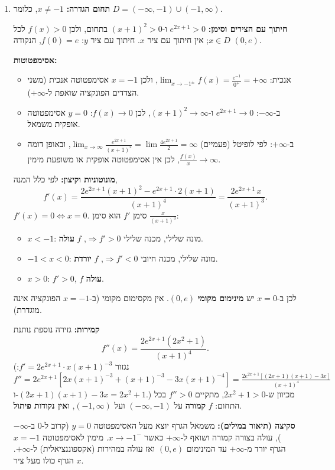 \begin{solution}
\begin{enumerate}
  \item \textbf{תחום הגדרה:} $x\neq -1$, כלומר $D=(-\infty,-1)\cup(-1,\infty)$.

  \textbf{חיתוך עם הצירים וסימן:} $e^{2x+1}>0$ ו-$(x+1)^2>0$ בתחום, ולכן $f(x)>0$ לכל $x\in D$; אין חיתוך עם ציר $x$. חיתוך עם ציר $y$: $f(0)=e$, הנקודה $(0,e)$.

  \textbf{אסימפטוטות:}
  \begin{itemize}
    \item אנכית: $\lim_{x\to-1^\pm}f(x)=\frac{e^{-1}}{0^+}=+\infty$, ולכן $x=-1$ אסימפטוטה אנכית (משני הצדדים הפונקציה שואפת ל-$+\infty$).
    \item ב-$-\infty$: $e^{2x+1}\to 0$ ו-$(x+1)^2\to\infty$, לכן $f(x)\to0$: $y=0$ אסימפטוטה אופקית משמאל.
    \item ב-$+\infty$: לפי לופיטל (פעמיים) $\lim_{x\to\infty}\frac{e^{2x+1}}{(x+1)^2}=\lim\frac{4e^{2x+1}}{2}=\infty$, ובאופן דומה $\frac{f(x)}{x}\to\infty$, לכן אין אסימפטוטה אופקית או משופעת מימין.
  \end{itemize}

  \textbf{מונוטוניות וקיצון:} לפי כלל המנה,
  \[ f'(x)=\frac{2e^{2x+1}(x+1)^2-e^{2x+1}\cdot2(x+1)}{(x+1)^4}=\frac{2e^{2x+1}\,x}{(x+1)^3}. \]
  $f'(x)=0\iff x=0$. סימן $f'$ הוא סימן $\frac{x}{(x+1)^3}$:
  \begin{itemize}
    \item $x<-1$: מונה שלילי, מכנה שלילי $\Rightarrow f'>0$, $f$ \textbf{עולה}.
    \item $-1<x<0$: מונה שלילי, מכנה חיובי $\Rightarrow f'<0$, $f$ \textbf{יורדת}.
    \item $x>0$: $f'>0$, $f$ \textbf{עולה}.
  \end{itemize}
  לכן ב-$x=0$ יש \textbf{מינימום מקומי} $(0,e)$. אין מקסימום מקומי (ב-$x=-1$ הפונקציה אינה מוגדרת).

  \textbf{קמירות:} גזירה נוספת נותנת
  \[ f''(x)=\frac{2e^{2x+1}(2x^2+1)}{(x+1)^4}. \]
  (נגזור $f'=2e^{2x+1}\cdot x(x+1)^{-3}$: $f''=2e^{2x+1}\left[2x(x+1)^{-3}+(x+1)^{-3}-3x(x+1)^{-4}\right]=\frac{2e^{2x+1}\left[(2x+1)(x+1)-3x\right]}{(x+1)^4}$ ו-$(2x+1)(x+1)-3x=2x^2+1$.)
  מכיוון ש-$2x^2+1>0$, מתקיים $f''>0$ בכל התחום: $f$ \textbf{קמורה} על $(-\infty,-1)$ ועל $(-1,\infty)$, ו\textbf{אין נקודות פיתול}.

  \textbf{סקיצה (תיאור במילים):} משמאל הגרף יוצא מעל האסימפטוטה $y=0$ (קרוב ל-$0$ ב-$-\infty$), עולה בצורה קמורה ושואף ל-$+\infty$ כאשר $x\to-1^-$. מימין לאסימפטוטה $x=-1$ הגרף יורד מ-$+\infty$ עד המינימום $(0,e)$ ואז עולה במהירות (אקספוננציאלית) ל-$+\infty$. הגרף כולו מעל ציר $x$.


\end{enumerate}
\end{solution}
